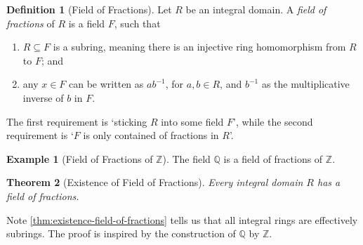 \documentclass{article}
\newtheorem{theorem}{Theorem}[section]
\theoremstyle{definition}
\newtheorem{definition}[theorem]{Definition}
\newtheorem*{example*}{Example}
\theoremstyle{remark}
\newcommand{\inverse}{^{-1}}
\newcommand{\subring}{\subseteq}
\newcommand{\ZZ}{\mathbb{Z}}
\newcommand{\QQ}{\mathbb{Q}}
\begin{document}
\begin{definition}[Field of Fractions]
    \label{def:field-of-fractions}%
    Let \(R\) be an integral domain. A \emph{field of fractions} of \(R\) is a field \(F\), such that
    \begin{enumerate}
        \item \(R \subring F\) is a subring, meaning there is an injective ring homomorphism from \(R\) to \(F\); and
        \item any \(x \in F\) can be written as \(a b \inverse\), for \(a, b \in R\), and \(b\inverse\) as the multiplicative inverse of \(b\) in \(F\).
    \end{enumerate}
\end{definition}

The first requirement is `sticking \(R\) into some field \(F\)', while the second requirement is `\(F\) is only contained of fractions in \(R\)'.

\begin{example*}[Field of Fractions of \(\ZZ\)]
    \label{ex:field-of-fractions-z}%
    The field \(\QQ\) is a field of fractions of \(\ZZ\).
\end{example*}

\begin{theorem}[Existence of Field of Fractions]
    \label{thm:existence-field-of-fractions}%
    Every integral domain \(R\) has a field of fractions.
\end{theorem}

Note \autoref{thm:existence-field-of-fractions} tells us that all integral rings are effectively subrings. The proof is inspired by the construction of \(\QQ\) by \(\ZZ\).
\end{document}
